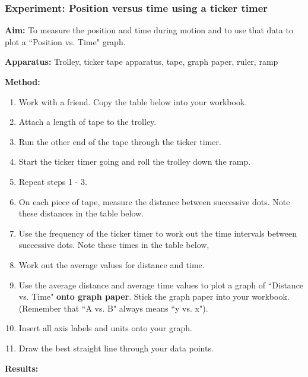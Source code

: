             \subsubsection{ Experiment: Position versus time using a ticker timer}
            \nopagebreak
            \label{m38795*id71968}\noindent{}\textbf{Aim:}
To measure the position and time during motion and to use that data to plot a ``Position vs. Time" graph.\par 
        \label{m38795*id71236}\noindent{}\textbf{Apparatus:}
Trolley, ticker tape apparatus, tape, graph paper, ruler, ramp\par 
        \label{m38795*id713131}\noindent{}\textbf{Method:}
        \label{m38795*id713199}\begin{enumerate}[noitemsep, label=\textbf{\arabic*}. ] 
            \label{m38795*id1972}\item Work with a friend. Copy the table below into your workbook.
\label{m38795*uid1051}\item Attach a length of tape to the trolley.
\label{m38795*id7254233}\item Run the other end of the tape through the ticker timer.
\label{m38795*id76313512}\item Start the ticker timer going and roll the trolley down the ramp.
\label{m38795*uid14402}\item Repeat steps 1 - 3.
\label{m38795*uid10333}\item On each piece of tape, measure the distance between successive dots. Note these distances in the table below.
\label{m38795*id752232}\item Use the frequency of the ticker timer to work out the time intervals between successive dots. Note these times in the table below,
\label{m38795*id614396}\item Work out the average values for distance and time. 
\label{m38795*uid13404}\item Use the average distance and average time values to plot a graph of ``Distance vs. Time" \textbf{onto graph paper}. Stick the graph paper into your workbook. (Remember that ``A vs. B" always means ``y vs. x").
\label{m38795*uid10584}\item Insert all axis labels and units onto your graph.
\label{m38795*uid10653}\item Draw the best straight line through your data points.
\end{enumerate}
        \par 
        \label{m38795*id7141045}
          \textbf{Results:}
